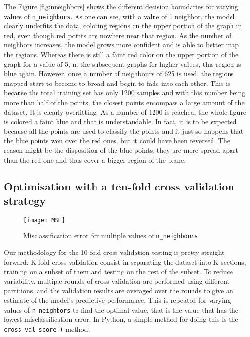 \documentclass[12pt]{article}
\begin{document}
The Figure \ref{fig:nneighbors} shows the different decision boundaries for varying values of \texttt{n\_neighbors}. As one can see, with a value of 1 neighbor, the model clearly underfits the data, coloring regions on the upper portion of the graph in red, even though red points are nowhere near that region. As the number of neighbors increases, the model grows more confident and is able to better map the regions. Whereas there is still a faint red color on the upper portion of the graph for a value of 5, in the subsequent graphs for higher values, this region is blue again.
However, once a number of neighbours of 625 is used, the regions mapped start to become to broad and begin to fade into each other. This is because the total training set has only 1200  samples and with this number being more than half of the points, the closest points encompass a large amount of the dataset. It is clearly overfitting.
As a number of 1200 is reached, the whole figure is colored a faint blue and that is understandable. In fact, it is to be expected because all the points are used to classify the points and it just so happens that the blue points won over the red ones, but it could have been reversed. The reason might be the disposition of the blue points, they are more spread apart than the red one and thus cover a bigger region of the plane.
~
~
~
~
\subsection{Optimisation with a ten-fold cross validation strategy}

\begin{figure}[H]
    \centering
    \texttt{[image: MSE]}
    \caption{Misclassification error for multiple values of \texttt{n\_neighbours}}
    \label{fig:MSE}
\end{figure}


Our methodology for the 10-fold cross-validation testing is pretty straight forward. K-fold cross validation consist in separating the dataset into K sections, training on a subset of them and testing on the rest of the subset. To reduce variability, multiple rounds of cross-validation are performed using different partitions, and the validation results are averaged over the rounds to give an estimate of the model’s predictive performance. This is repeated for varying values of \texttt{n\_neighbors} to find the optimal value, that is the value that has the lowest misclassification error.
In Python, a simple method for doing this is the \texttt{cross\_val\_score()} method.
\end{document}
